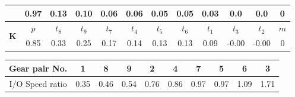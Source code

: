\documentclass[svgnames, table, smaller]{beamer}
\begin{document}
\begin{frame}
{\begin{table}[!ht]
\begin{tabular}{|c|c|c|c|c|c|c|c|c|c|c|c|}
    & 0.97 & 0.13 & 0.10 & 0.06 & 0.06 & 0.05 & 0.05 & 0.03 & 0.0 & 0.0 & 0 \\ 
    \hline
    \multirow{2}{*}{\textbf{K}} & $p$ &\cellcolor[gray]{0.45} $t_8$ & \cellcolor[gray]{0.50} $t_9$ & \cellcolor[gray]{0.65} $t_7$ &\cellcolor[gray]{0.60} $t_4$ &\cellcolor[gray]{0.70} $t_5$ &\cellcolor[gray]{0.75} $t_6$ &\cellcolor[gray]{0.40} $t_1$ &\cellcolor[gray]{0.80} $t_3$ &\cellcolor[gray]{0.55} $t_2$ & $m$ \\
    & 0.85 & 0.33 & 0.25 & 0.17 & 0.14 & 0.13 & 0.13 & 0.09 & -0.00 & -0.00 & 0 \\ 
    \hline
  \end{tabular}
  \label{gt11pcTopWeights}
\end{table}
}


{\tiny
\begin{table}[!ht]
  \centering
  \begin{tabular}{|c|c|c|c|c|c|c|c|c|c|}
    \hline
    Gear pair No. & \cellcolor[gray]{0.40} 1 & \cellcolor[gray]{0.45} 8 & \cellcolor[gray]{0.50} 9 & \cellcolor[gray]{0.55} 2 & \cellcolor[gray]{0.60} 4 & \cellcolor[gray]{0.65} 7 & \cellcolor[gray]{0.70} 5 &\cellcolor[gray]{0.75} 6 & \cellcolor[gray]{0.80} 3\\
    \hline
    I/O Speed ratio & \cellcolor[gray]{0.40} 0.35 & \cellcolor[gray]{0.45} 0.46 & \cellcolor[gray]{0.50} 0.54 & \cellcolor[gray]{0.55} 0.76 & \cellcolor[gray]{0.60} 0.86 & \cellcolor[gray]{0.65} 0.97 & \cellcolor[gray]{0.70}0.97 & \cellcolor[gray]{0.75} 1.09 & \cellcolor[gray]{0.80} 1.71\\
    \hline
  \end{tabular}
  \label{iosRatio}
\end{table}
}


\end{frame}
\end{document}
